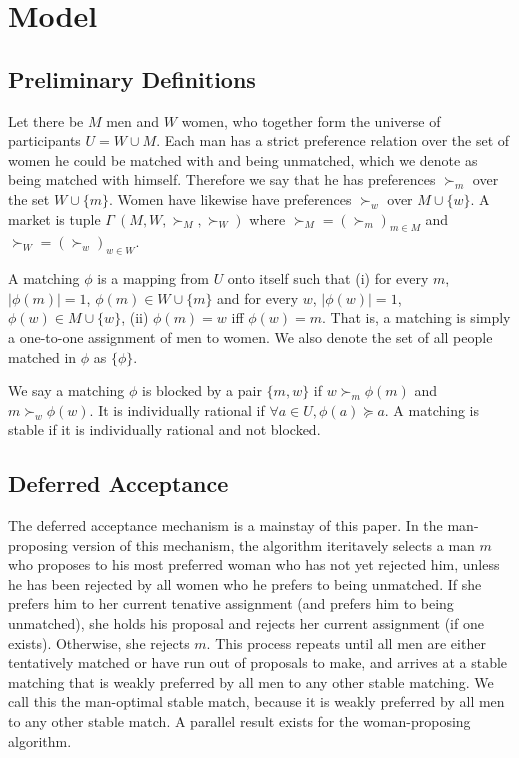 \documentclass[WP]{AEA}
\begin{document}
\section{Model}
\subsection{Preliminary Definitions}

Let there be $M$ men and $W$ women, who together form the universe of participants $U = W \cup M$.  Each man has a strict preference relation over the set of women he could be matched with and being unmatched, which we denote as being matched with himself. Therefore we say that he has preferences $\succ_{m}$ over the set $W \cup \{m\}$. Women have likewise have preferences $\succ_w$ over $M \cup \{w\}$. A market is tuple $\Gamma \ (M,W, \succ_{M}, \succ_W)$ where $\succ_{M} = (\succ_{m})_{m \in M}$ and $\succ_W = (\succ_w)_{w \in W}$.

A matching $\phi$ is a mapping from $U$ onto itself such that (i) for every $m$, $|\phi(m)| = 1$, $\phi(m) \in W \cup \{m\} $ and for every  $w$, $|\phi(w)| = 1$, $\phi(w) \in M \cup \{w\}$, (ii) $\phi(m) = w$ iff $\phi(w) = m$.  That is, a matching is simply a one-to-one assignment of men to women. We also denote the set of all people matched in $\phi$ as $\{\phi\}$.

We say a matching $\phi$ is blocked by a pair $\{m,w\}$ if $w \succ_m \phi(m)$ and $m \succ_w \phi(w)$. It is individually rational if $\forall a \in U ,\phi(a) \succeq a$. A matching is stable if it is individually rational and not blocked.

\subsection{Deferred Acceptance}
The deferred acceptance mechanism is a mainstay of this paper. In the man-proposing version of this mechanism, the algorithm iteritavely selects a man $m$ who proposes to his most preferred woman who has not yet rejected him, unless he has been rejected by all women who he prefers to being unmatched.  If she prefers him to her current tenative assignment (and prefers him to being unmatched), she holds his proposal and rejects her current assignment (if one exists). Otherwise, she rejects $m$.  This process repeats until all men are either tentatively matched or have run out of proposals to make, and arrives at a stable matching that is weakly preferred by all men to any other stable matching.  We call this the man-optimal stable match, because it is weakly preferred by all men to any other stable match.  A parallel result exists for the woman-proposing algorithm.
\end{document}
